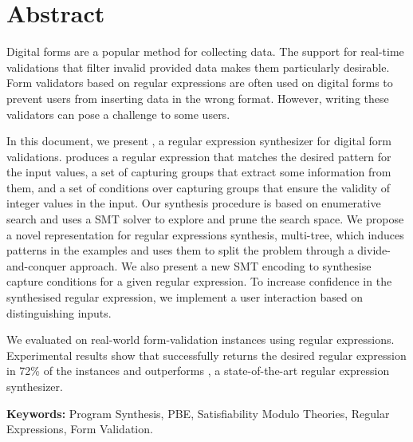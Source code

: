 \section*{Abstract}

Digital forms are a popular method for collecting data.
The support for real-time validations that filter invalid provided data makes them particularly desirable.
Form validators based on regular expressions are often used on digital forms to prevent users from inserting data in the wrong format.
However, writing these validators can pose a challenge to some users.

In this document, we present \Forest, a regular expression synthesizer for digital form validations.
\Forest produces a regular expression that matches the desired pattern for the input values, a set of capturing groups that extract some information from them,
and 
a set of conditions over capturing groups that ensure the validity of integer values in the input.
Our synthesis procedure is based on enumerative search and uses a \ac{SMT} solver to explore and prune the search space.
We propose a novel representation for regular expressions synthesis, multi-tree, which induces patterns in the examples and uses them to split the problem through a divide-and-conquer approach.
We also present a new \ac{SMT} encoding to synthesise capture conditions for a given regular expression.
To increase confidence in the synthesised regular expression, we implement a user interaction based on distinguishing inputs. 

We evaluated \Forest{} on real-world form-validation instances using regular expressions. Experimental results show that \Forest{} successfully returns the desired regular expression in 72\% of the instances and outperforms \Regel, a state-of-the-art regular expression synthesizer.

\vfill
\noindent
\textbf{\Large Keywords:} Program Synthesis, \acl{PBE}, Satisfiability Modulo Theories, Regular Expressions, Form Validation.
\cleardoublepage
